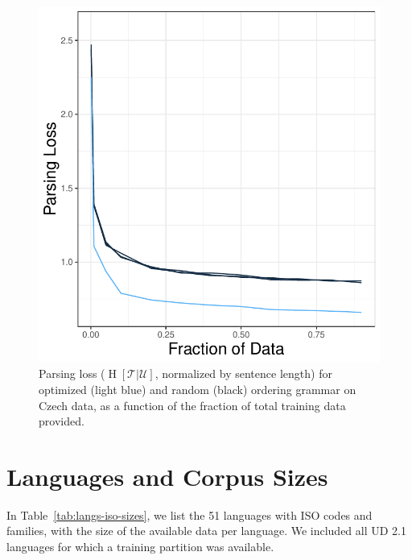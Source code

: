 \documentclass[10pt,twoside,lineno]{article}
\newcommand{\utterance}{\mathcal{U}}
\newcommand{\tree}{\mathcal{T}}
\begin{document}
\begin{figure}[ht]
    \centering
    \includegraphics[scale=.4]{../results/learning-curves/figures/learning-parser-czech-logloss.pdf} 

	\caption{Parsing loss ($\operatorname{H}[\tree|\utterance]$, normalized by sentence length) for optimized (light blue) and random (black) ordering grammar on Czech data, as a function of the fraction of total training data provided.}
    \label{fig:learning-czech}
\end{figure}







\section{Languages and Corpus Sizes}
In Table~\ref{tab:langs-iso-sizes}, we list the 51 languages with ISO codes and families, with the size of the available data per language.
We included all UD 2.1 languages for which a training partition was available.

\end{document}
